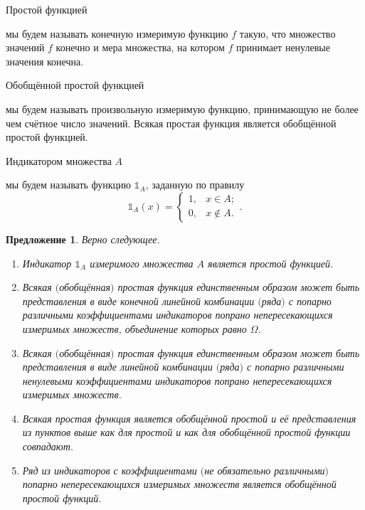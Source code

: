 \documentclass[12pt]{article}
\newtheorem{proposition}[theorem]{Предложение}
\numberwithin{theorem}{section}
\theoremstyle{definition}
\newcommand{\defin}[2]{\hypertarget{#2}{{\color{red} #1}}}
\newcommand{\ind}{\mathds{1}}
\newcommand{\definefuntwo}[4]{
	\begin{cases}
		#1, & #2; \\
		#3, & #4.
	\end{cases}
}
\begin{document}
	\defin{Простой функцией}{simple-function} мы будем называть конечную измеримую функцию $ f $ такую, что
	множество значений $ f $ конечно и мера множества, на котором $ f $ принимает ненулевые значения конечна.
	
	\defin{Обобщённой простой функцией}{generalized-simple-function} мы будем называть произвольную измеримую функцию, 
	принимающую не более чем счётное число значений. Всякая простая функция является обобщённой простой функцией.
	
	\defin{Индикатором множества $ A $}{indicator} мы будем называть функцию $ \ind_{A} $, заданную по правилу
	$$ \ind_A(x) = \definefuntwo{1}{x \in A}{0}{x \notin A}. $$
	
	\begin{proposition} \label{simple function description}
		Верно следующее.
		\begin{enumerate}
			\item Индикатор $ \ind_A $ измеримого множества $ A $ является простой функцией. 
			\label{simple function description | indicator}
			\item Всякая $ ( $обобщённая$ ) $ простая функция 
			единственным образом может быть представления в виде конечной линейной комбинации $ ( $ряда$ ) $
			с попарно различными коэффициентами индикаторов попрано непересекающихся измеримых множеств, 
			объединение которых равно $ \Omega $.
			\label{simple function description | decomposition}
			\item Всякая $ ( $обобщённая$ ) $ простая функция 
			единственным образом может быть представления в виде линейной комбинации
			$ ( $ряда$ ) $ с попарно различными ненулевыми коэффициентами 
			индикаторов попрано непересекающихся измеримых множеств.
			\label{simple function description | non-zero decomposition}
			\item Всякая простая функция является обобщённой простой и её представления из пунктов выше
			как для простой и как для обобщённой простой функции совпадают.
			\label{simple function description | simple and generalized simple}
			\item Ряд из индикаторов с коэффициентами $ ( $не обязательно различными$ ) $ 
			 попарно непересекающихся измеримых множеств является обобщённой простой функций.
			\label{simple function description | construction}
		\end{enumerate}
	\end{proposition}
	
\end{document}

